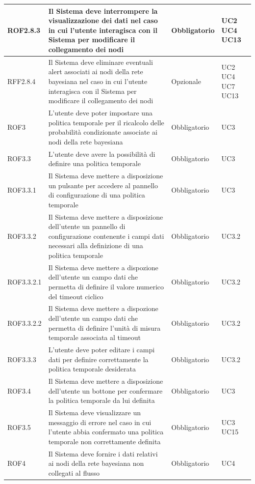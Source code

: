 \begin{center}
\begin{longtable}[c]{|m{}|m{}|m{}|m{}|}
\hline
ROF2.8.3 & Il Sistema deve interrompere la visualizzazione dei dati nel caso in cui l'utente interagisca con il Sistema per modificare il collegamento dei nodi & Obbligatorio & UC2 UC4 UC13\\
\hline
\rowcolor{grigio}RFF2.8.4 & Il Sistema deve eliminare eventuali alert associati ai nodi della rete bayesiana nel caso in cui l'utente interagisca con il Sistema per modificare il collegamento dei nodi & Opzionale & UC2 UC4 UC7 UC13\\
\hline
ROF3 & L'utente deve poter impostare una politica temporale per il ricalcolo delle probabilità condizionate associate ai nodi della rete bayesiana & Obbligatorio & UC3\\
\hline
\rowcolor{grigio}ROF3.3 & L'utente deve avere la possibilità di definire una politica temporale & Obbligatorio & UC3\\ 
\hline
ROF3.3.1 & Il Sistema deve mettere a disposizione un pulsante per accedere al pannello di configurazione di una politica temporale & Obbligatorio & UC3\\
\hline
\rowcolor{grigio}ROF3.3.2 & Il Sistema deve mettere a disposizione dell'utente un pannello di configurazione contenente i campi dati necessari alla definizione di una politica temporale & Obbligatorio & UC3.2\\
\hline
ROF3.3.2.1 & Il Sistema deve mettere a dispozione dell'utente un campo dati che permetta di definire il valore numerico del timeout ciclico & Obbligatorio & UC3.2\\
\hline
\rowcolor{grigio}ROF3.3.2.2 & Il Sistema deve mettere a dispozione dell'utente un campo dati che permetta di definire l'unità di misura temporale associata al timeout & Obbligatorio & UC3.2\\
\hline
ROF3.3.3 & L'utente deve poter editare i campi dati per definire correttamente la politica temporale desiderata & Obbligatorio & UC3.2\\
\hline
\rowcolor{grigio}ROF3.4 & Il Sistema deve mettere a disposizione dell'utente un bottone per confermare la politica temporale da lui definita & Obbligatorio & UC3\\
\hline
ROF3.5 & Il Sistema deve visualizzare un messaggio di errore nel caso in cui l'utente abbia confermato una politica temporale non correttamente definita & Obbligatorio & UC3 UC15\\
\hline
\rowcolor{grigio}ROF4 & Il Sistema deve fornire i dati relativi ai nodi della rete bayesiana non collegati al flusso & Obbligatorio & UC4\\

\end{longtable}
\end{center}
